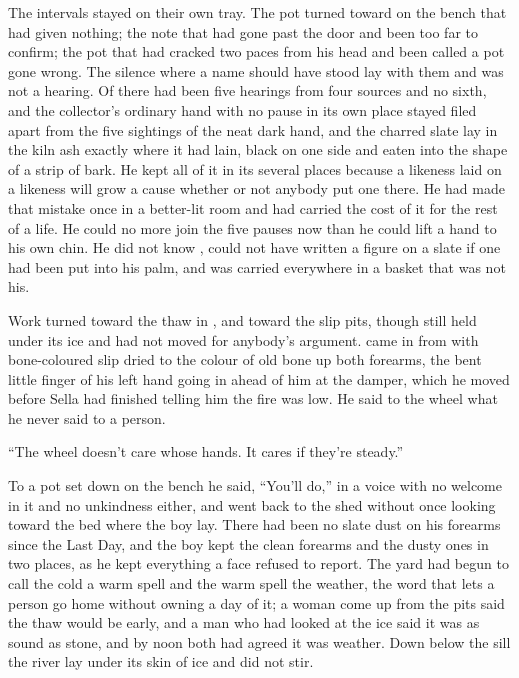 The intervals stayed on their own tray. The pot turned toward on the bench that had given nothing; the note that had gone past the door and been too far to confirm; the pot that had cracked two paces from his head and been called a pot gone wrong. The silence where a name should have stood lay with them and was not a hearing. Of  there had been five hearings from four sources and no sixth, and the  collector's ordinary hand with no pause in its own place stayed filed apart from the five sightings of the neat dark hand, and the charred slate lay in the kiln ash exactly where it had lain, black on one side and eaten into the shape of a strip of bark. He kept all of it in its several places because a likeness laid on a likeness will grow a cause whether or not anybody put one there. He had made that mistake once in a better-lit room and had carried the cost of it for the rest of a life. He could no more join the five pauses now than he could lift a hand to his own chin. He did not know , could not have written a figure on a slate if one had been put into his palm, and was carried everywhere in a basket that was not his.

\scenebreak

Work turned toward the thaw in , and toward the slip pits, though  still held under its ice and had not moved for anybody's argument.  came in from  with bone-coloured slip dried to the colour of old bone up both forearms, the bent little finger of his left hand going in ahead of him at the damper, which he moved before Sella had finished telling him the fire was low. He said to the wheel what he never said to a person.

“The wheel doesn't care whose hands. It cares if they're steady.”

To a pot set down on the bench he said, “You'll do,” in a voice with no welcome in it and no unkindness either, and went back to the shed without once looking toward the bed where the boy lay. There had been no slate dust on his forearms since the Last Day, and the boy kept the clean forearms and the dusty ones in two places, as he kept everything a face refused to report. The yard had begun to call the cold a warm spell and the warm spell the weather, the word that lets a person go home without owning a day of it; a woman come up from the pits said the thaw would be early, and a man who had looked at the ice said it was as sound as stone, and by noon both had agreed it was weather. Down below the sill the river lay under its skin of ice and did not stir.

